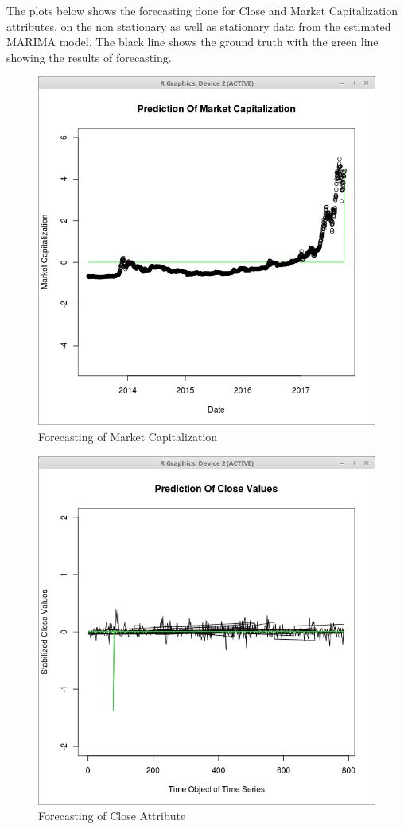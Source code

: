 \documentclass{article}
\begin{document}
\newpage
The plots below shows the forecasting done for Close and Market Capitalization attributes, on the non stationary as well as stationary data from the estimated MARIMA model. The black line shows the ground truth with the green line showing the results of forecasting.
\begin{figure}[ht]
	\centering
	\includegraphics[width = 6 cm]{market_cap_prediction.png}
	\caption{Forecasting of Market Capitalization}
	\label{fig: btc_non_stat_pred}
\end{figure}

\begin{figure}[ht]
	\centering
	\includegraphics[width = 6 cm]{stationary_btc_prediction.png}
	\caption{Forecasting of Close Attribute}
	\label{fig: btc_stat_pred}
\end{figure}

\newpage
\end{document}
